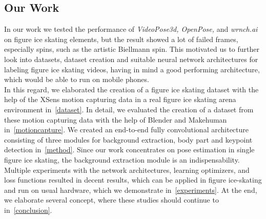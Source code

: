     \subsection*{Our Work}
    In our work we tested the performance of \textit{VideoPose3d, OpenPose,} and \textit{wrnch.ai} on figure ice skating elements,
but the result showed a lot of failed frames, especially spins, such as the artistic Biellmann spin.
This motivated us to further look into datasets, dataset creation and suitable neural network architectures for labeling
figure ice skating videos, having in mind a good performing architecture, which would be able to run on mobile phones.\\
    In this regard, we elaborated the creation of a figure ice skating dataset with the help of the XSens motion capturing data in a
    real figure ice skating arena
    environment in~\autoref{dataset}.
    In detail, we evaluated the creation of a dataset from these motion capturing data with the help of Blender and
    Makehuman in~\autoref{motioncapture}.
    We created an end-to-end fully convolutional architecture consisting of three modules for background extraction,
    body part and keypoint detection in~\autoref{method}.
    Since our work concentrates on pose estimation in single figure ice skating, the background extraction module is
    an indispensability.
    Multiple experiments with the network architectures, learning optimizers, and loss functions resulted in decent
    results,
    which can be applied in figure ice-skating and run on usual hardware, which we demonstrate in~\autoref{experiments}.
    At the end, we elaborate several concept, where these studies should continue to in~\autoref{conclusion}.



